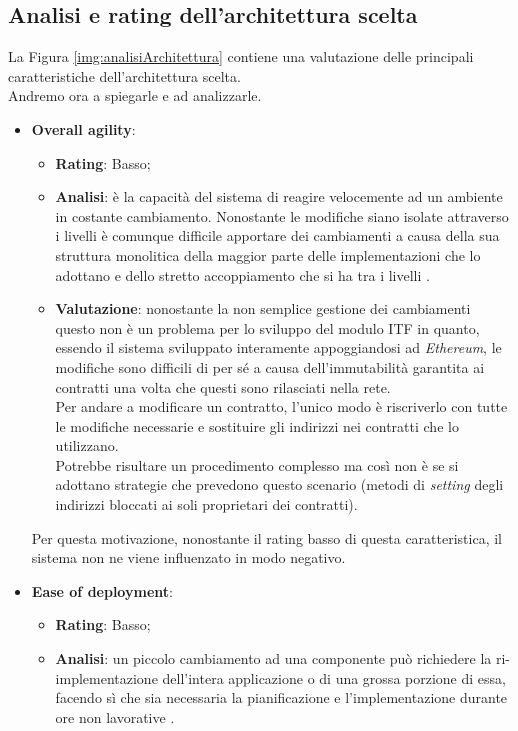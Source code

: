 \subsection{Analisi e rating dell'architettura scelta}
La Figura \ref{img:analisiArchitettura} contiene una valutazione delle principali caratteristiche dell'architettura scelta.\\
Andremo ora a spiegarle e ad analizzarle.
\begin{itemize}
	\item \textbf{Overall agility}:
	\begin{itemize}
		\item \textbf{Rating}: Basso;
		\item \textbf{Analisi}: è la capacità del sistema di reagire velocemente ad un ambiente in costante cambiamento. Nonostante le modifiche siano isolate attraverso i livelli è comunque difficile apportare dei cambiamenti a causa della sua struttura monolitica della maggior parte delle implementazioni che lo adottano e dello stretto accoppiamento che si ha tra i livelli \cite{3tierArch,3tierArch2}.
		\item \textbf{Valutazione}: nonostante la non semplice gestione dei cambiamenti questo non è un problema per lo sviluppo del modulo \gls{ITF} in quanto, essendo il sistema sviluppato interamente appoggiandosi ad \textit{Ethereum}, le modifiche sono difficili di per sé a causa dell'immutabilità garantita ai contratti una volta che questi sono rilasciati nella rete.\\
		Per andare a modificare un contratto, l'unico modo è riscriverlo con tutte le modifiche necessarie e sostituire gli indirizzi nei contratti che lo utilizzano.\\
		Potrebbe risultare un procedimento complesso ma così non è se si adottano strategie che prevedono questo scenario (metodi di \textit{setting} degli indirizzi bloccati ai soli proprietari dei contratti).\\
	\end{itemize}
	Per questa motivazione, nonostante il rating basso di questa caratteristica, il sistema non ne viene influenzato in modo negativo.
	\item \textbf{Ease of deployment}:
	\begin{itemize}
		\item \textbf{Rating}: Basso;
		\item \textbf{Analisi}: un piccolo cambiamento ad una componente può richiedere la ri-implementazione dell'intera applicazione o di una grossa porzione di essa, facendo sì che sia necessaria la pianificazione e l'implementazione durante ore non lavorative \cite{3tierArch,3tierArch2}.

\end{itemize}
\end{itemize}
